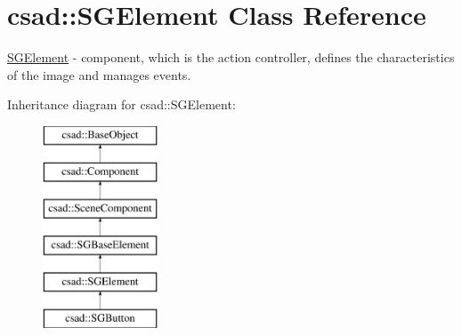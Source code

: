 \hypertarget{classcsad_1_1_s_g_element}{\section{csad\-:\-:S\-G\-Element Class Reference}
\label{classcsad_1_1_s_g_element}
}


\hyperlink{classcsad_1_1_s_g_element}{S\-G\-Element} -\/ component, which is the action controller, defines the characteristics of the image and manages events.  


Inheritance diagram for csad\-:\-:S\-G\-Element\-:\begin{figure}[H]
\begin{center}
\leavevmode
\includegraphics[height=6.000000cm]{classcsad_1_1_s_g_element}
\end{center}
\end{figure}
